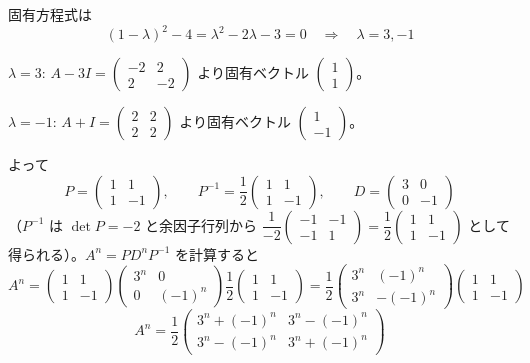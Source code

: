 
固有方程式は
\[
(1-\lambda)^{2} - 4 = \lambda^{2} - 2\lambda - 3 = 0 \quad\Longrightarrow\quad \lambda = 3, -1
\]

$\lambda = 3$: $A - 3I = \begin{pmatrix} -2 & 2 \\ 2 & -2 \end{pmatrix}$ より固有ベクトル $\begin{pmatrix}1\\1\end{pmatrix}$。

$\lambda = -1$: $A + I = \begin{pmatrix} 2 & 2 \\ 2 & 2 \end{pmatrix}$ より固有ベクトル $\begin{pmatrix}1\\-1\end{pmatrix}$。

よって
\[
P = \begin{pmatrix} 1 & 1 \\ 1 & -1 \end{pmatrix}, \qquad
P^{-1} = \frac{1}{2}\begin{pmatrix} 1 & 1 \\ 1 & -1 \end{pmatrix}, \qquad
D = \begin{pmatrix} 3 & 0 \\ 0 & -1 \end{pmatrix}
\]
（$P^{-1}$ は $\det P = -2$ と余因子行列から $\dfrac{1}{-2}\begin{pmatrix}-1 & -1\\-1 & 1\end{pmatrix} = \dfrac12\begin{pmatrix}1&1\\1&-1\end{pmatrix}$ として得られる）。$A^{n} = PD^{n}P^{-1}$ を計算すると
\[
A^{n} = \begin{pmatrix} 1 & 1 \\ 1 & -1 \end{pmatrix}
\begin{pmatrix} 3^{n} & 0 \\ 0 & (-1)^{n} \end{pmatrix}
\frac{1}{2}\begin{pmatrix} 1 & 1 \\ 1 & -1 \end{pmatrix}
= \frac{1}{2}\begin{pmatrix} 3^{n} & (-1)^{n} \\ 3^{n} & -(-1)^{n} \end{pmatrix}
\begin{pmatrix} 1 & 1 \\ 1 & -1 \end{pmatrix}
\]
\[
\boxed{\; A^{n} = \frac{1}{2}\begin{pmatrix} 3^{n} + (-1)^{n} & 3^{n} - (-1)^{n} \\ 3^{n} - (-1)^{n} & 3^{n} + (-1)^{n} \end{pmatrix} \;}
\]


